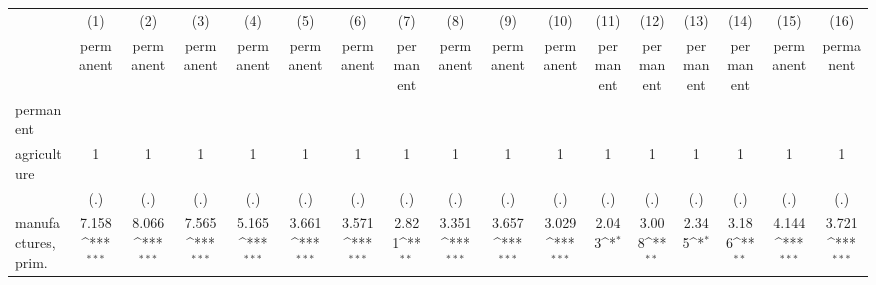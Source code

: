{
\def\sym#1{\ifmmode^{#1}\else\(^{#1}\)\fi}
\begin{tabular}{l*{16}{c}}
\hline\hline
                    &\multicolumn{1}{c}{(1)}&\multicolumn{1}{c}{(2)}&\multicolumn{1}{c}{(3)}&\multicolumn{1}{c}{(4)}&\multicolumn{1}{c}{(5)}&\multicolumn{1}{c}{(6)}&\multicolumn{1}{c}{(7)}&\multicolumn{1}{c}{(8)}&\multicolumn{1}{c}{(9)}&\multicolumn{1}{c}{(10)}&\multicolumn{1}{c}{(11)}&\multicolumn{1}{c}{(12)}&\multicolumn{1}{c}{(13)}&\multicolumn{1}{c}{(14)}&\multicolumn{1}{c}{(15)}&\multicolumn{1}{c}{(16)}\\
                    &\multicolumn{1}{c}{permanent}&\multicolumn{1}{c}{permanent}&\multicolumn{1}{c}{permanent}&\multicolumn{1}{c}{permanent}&\multicolumn{1}{c}{permanent}&\multicolumn{1}{c}{permanent}&\multicolumn{1}{c}{permanent}&\multicolumn{1}{c}{permanent}&\multicolumn{1}{c}{permanent}&\multicolumn{1}{c}{permanent}&\multicolumn{1}{c}{permanent}&\multicolumn{1}{c}{permanent}&\multicolumn{1}{c}{permanent}&\multicolumn{1}{c}{permanent}&\multicolumn{1}{c}{permanent}&\multicolumn{1}{c}{permanent}\\
\hline
permanent           &                     &                     &                     &                     &                     &                     &                     &                     &                     &                     &                     &                     &                     &                     &                     &                     \\
agriculture         &           1         &           1         &           1         &           1         &           1         &           1         &           1         &           1         &           1         &           1         &           1         &           1         &           1         &           1         &           1         &           1         \\
                    &         (.)         &         (.)         &         (.)         &         (.)         &         (.)         &         (.)         &         (.)         &         (.)         &         (.)         &         (.)         &         (.)         &         (.)         &         (.)         &         (.)         &         (.)         &         (.)         \\
[1em]
manufactures, prim. &       7.158\sym{***}&       8.066\sym{***}&       7.565\sym{***}&       5.165\sym{***}&       3.661\sym{***}&       3.571\sym{***}&       2.821\sym{**} &       3.351\sym{***}&       3.657\sym{***}&       3.029\sym{***}&       2.043\sym{*}  &       3.008\sym{**} &       2.345\sym{*}  &       3.186\sym{**} &       4.144\sym{***}&       3.721\sym{***}\\

\end{tabular}}
